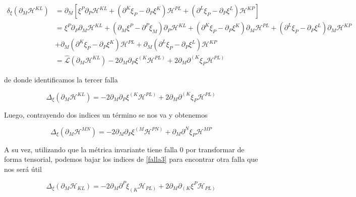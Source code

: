 \documentclass{article}
\numberwithin{equation}{section}
\begin{document}
\begin{equation}\label{key}
\begin{aligned}
\delta_{\xi} \left( \partial_M \mathcal{H}^{KL}\right) &= \partial_M \left[ \xi^P\partial_P \mathcal{H}^{KL} + \left(\partial^K \xi_P - \partial_P\xi^K\right)\mathcal{H}^{PL} + \left(\partial^L \xi_P - \partial_P\xi^L\right)\mathcal{H}^{KP} \right]\\
&= \xi^P\partial_P \partial_M \mathcal{H}^{KL} + \left( \partial_M \xi^P - \partial^P \xi_M \right)\partial_P \mathcal{H}^{KL} +  \left(\partial^K \xi_P - \partial_P\xi^K\right)\partial_M\mathcal{H}^{PL} + \left(\partial^L \xi_P - \partial_P\xi^L\right)\partial_M\mathcal{H}^{KP}\\
&+ \partial_M\left(\partial^K \xi_P - \partial_P\xi^K\right)\mathcal{H}^{PL} + \partial_M \left(\partial^L \xi_P - \partial_P\xi^L\right)\mathcal{H}^{KP}\\
&= \hat{\mathcal{L}}\left( \partial_M \mathcal{H}^{KL} \right) - 2\partial_M \partial_P \xi^{\left(K\right.} \mathcal{H}^{\left.PL\right)} + 2\partial_M \partial^{\left(K\right.}\xi_P \mathcal{H}^{\left.PL\right)} 
\end{aligned}
\end{equation}

de donde identificamos la tercer falla

\begin{equation}\label{falla3}
\Delta_{\xi} \left( \partial_M \mathcal{H}^{KL}\right) = - 2\partial_M \partial_P \xi^{\left(K\right.} \mathcal{H}^{\left.PL\right)} + 2\partial_M \partial^{\left(K\right.}\xi_P \mathcal{H}^{\left.PL\right)} 
\end{equation}

Luego, contrayendo dos indices un término se nos va y obtenemos

\begin{equation}\label{falla4}
\Delta_{\xi} \left( \partial_M \mathcal{H}^{MN}\right) = - 2\partial_M \partial_P \xi^{\left(M\right.} \mathcal{H}^{\left.PN\right)} + \partial_M \partial^{N}\xi_P \mathcal{H}^{MP}
\end{equation}



A su vez, utilizando que la métrica invariante tiene falla 0 por transformar de forma tensorial, podemos bajar los indices de \ref{falla3} para encontrar otra falla que nos será útil

\begin{equation}\label{falla5}
\Delta_{\xi} \left( \partial_M \mathcal{H}_{KL}\right) = - 2\partial_M \partial^P \xi_{\left(K\right.} \mathcal{H}_{\left.PL\right)} + 2\partial_M \partial_{\left(K\right.}\xi^P \mathcal{H}_{\left.PL\right)} 
\end{equation}
\end{document}
